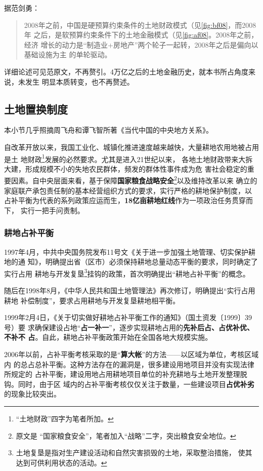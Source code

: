 据范剑勇\cite{fanjianyong}：
\begin{quotation}
  2008年之前，中国是硬预算约束条件的土地财政模式（见\cref{fig:bf08}，而2008年
  之后，是软预算约束条件下的土地金融模式（见\cref{fig:af08}。2008年之前，经济
  增长的动力是“制造业+房地产”两个轮子一起转，2008年之后是偏向以基础设施为主
  的单轮驱动。
\end{quotation}

详细论述可见范原文，不再赘引。4万亿之后的土地金融历史，就本书所占角度来说，未发生
明显本质转变，也不再赘述。

\subsection{土地置换制度}

本小节几乎照摘周飞舟和谭飞智所著《当代中国的中央地方关系》。

自改革开放以来，我国工业化、城镇化推进速度越来越快，大量耕地农用地被占用是土
地财政\footnote{“土地财政”四字为笔者所加。}发展的必然要求。尤其是进入21世纪以来，
各地土地财政带来大拆大建，形成规模不小的失地农民群体，频发的群体性事件成为危
害社会稳定的重要因素。自中央层面来看，基于保障\textbf{国家粮食战略安全}\footnote{原文是
“国家粮食安全”，笔者加入“战略”二字，突出粮食安全地位。}以及维持改革以来
确立的家庭联产承包责任制的基本经营组织方式的要求，实行严格的耕地保护制度，以
占补平衡为代表的系列政策应运而生，\textbf{18亿亩耕地红线}作为一项政治任务贯穿而下，
实行一把手问责制。

\subsubsection{耕地占补平衡}

1997年4月，中共中央国务院发布11号文《关于进一步加强土地管理、切实保护耕地的通
知》，明确提出省（区市）必须保持耕地总量动态平衡的要求，同时确定了实行占用
耕地与开发复垦\footnote{土地复垦是指对生产建设活动和自然灾害损毁的土地，采取整治措施，
  使其达到可供利用状态的活动。}挂钩的政策，首次明确提出“耕地占补平衡”的概念。

随后在1998年8月，《中华人民共和国土地管理法》再次修订，明确提出“实行占用耕地
补偿制度”，要求占用耕地与开发复垦耕地相平衡。

1999年2月4日，《关于切实做好耕地占补平衡工作的通知》（国土资发〔1999〕39号）要
求确保建设占地“\textbf{占一补一}”，逐步实现耕地占用的\textbf{先补后占、占优补优、不补不
  占}。自此，耕地占补平衡政策开始在全国各地大规模实施。

2006年以前，占补平衡考核采取的是“\textbf{算大帐}”的方法——以区域为单位，考核区域内
的总占总补平衡。这种方法存在的漏洞是，很多建设用地项目并没有实现法律所规定的
占补平衡，建设用地占用耕地项目单位的补充耕地与土地开发整理脱钩。同时，由于区
域内的占补平衡考核仅仅关注于数量，一些建设项目\textbf{占优补劣}的现象比较突出。

